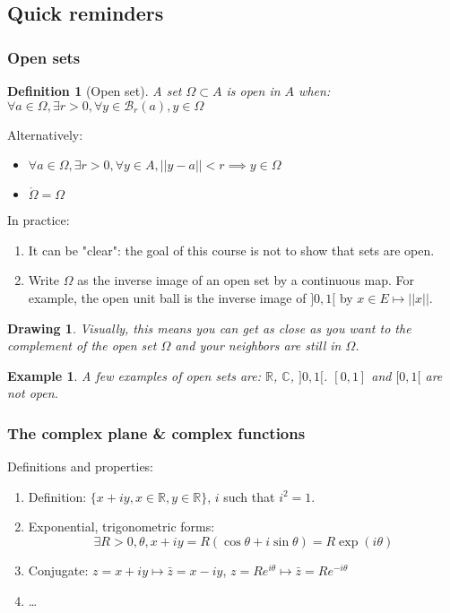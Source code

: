 \documentclass{article}
\newtheorem*{defi}{Definition}
\newtheorem*{example}{Example}
\newtheorem*{schema}{Drawing}
\begin{document}
\subsection{Quick reminders}

\subsubsection{Open sets}
\begin{defi}[Open set]
    A set $\Omega \subset A$ is open in $A$ when:$ \forall a\in\Omega, \exists r > 0, \forall y \in \mathcal{B}_r(a), y \in \Omega $
\end{defi}

Alternatively:
    \begin{itemize}
        \item $ \forall a\in\Omega, \exists r > 0, \forall y \in A, ||y - a|| < r \implies y \in \Omega $
        \item $\mathring \Omega = \Omega$
    \end{itemize}
In practice:
\begin{enumerate}
    \item It can be "clear": the goal of this course is not to show that sets are open. 
    \item Write $\Omega$ as the inverse image of an open set by a continuous map. For example, the open unit ball is the inverse image of $]0,1[$ by $x\in E \mapsto ||x||$.
\end{enumerate}
\begin{schema} Visually, this means you can get as close as you want to the complement of the open set $\Omega$ and your neighbors are still in $\Omega$.
\end{schema}

\begin{example}
A few examples of open sets are: $\mathbb{R}$, $\mathbb{C}$, $]0,1[$. $[0,1]$ and $[0,1[$ are not open.
\end{example}

\subsubsection{The complex plane \& complex functions}
Definitions and properties:
\begin{enumerate}
    \item Definition: $\lbrace x+iy, x\in\mathbb{R}, y\in\mathbb{R} \rbrace$, $i$ such that $i^2=1$.
    \item Exponential, trigonometric forms: $$\exists R>0, \theta, x+iy = R(\cos\theta + i\sin\theta)=R\exp(i\theta) $$
    \item Conjugate: $z=x+iy \mapsto \bar z = x - iy$, $z = Re^{i\theta} \mapsto \bar z = Re^{-i\theta}$
    \item \dots 
\end{enumerate}
\end{document}
